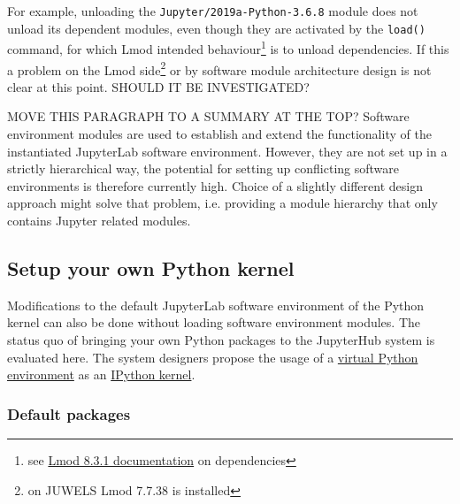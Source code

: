 For example, unloading the \verb|Jupyter/2019a-Python-3.6.8| module does not unload its dependent modules, even though they are activated by the \verb|load()| command, for which Lmod intended behaviour\footnote{see \href{https://lmod.readthedocs.io/en/latest/098_dependent_modules.html}{Lmod 8.3.1 documentation} on dependencies} is to unload dependencies.
If this a problem on the Lmod side\footnote{on JUWELS Lmod 7.7.38 is installed} or by software module architecture design is not clear at this point.
SHOULD IT BE INVESTIGATED?

MOVE THIS PARAGRAPH TO A SUMMARY AT THE TOP?
Software environment modules are used to establish and extend the functionality of the instantiated JupyterLab software environment.
However, they are not set up in a strictly hierarchical way, the potential for setting up conflicting software environments is therefore currently high.
Choice of a slightly different design approach might solve that problem, i.e. providing a module hierarchy that only contains Jupyter related modules.

\subsection{Setup your own Python kernel}

Modifications to the default JupyterLab software environment of the Python kernel can also be done without loading  software environment modules.
The status quo of bringing your own Python packages to the JupyterHub system is evaluated here.
The system designers propose the usage of a \href{https://docs.python.org/3/library/venv.html}{virtual Python environment} as an \href{https://ipython.org/ipython-doc/3/development/kernels.html#kernelspecs}{IPython kernel}.

\subsubsection{Default packages}
\label{sect:python-kernel:default-packages}

